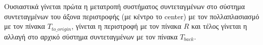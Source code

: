 \documentclass{article}
\begin{document}
Ουσιαστικά γίνεται πρώτα η μετατροπή συστήματος συντεταγμένων στο 
σύστημα συντεταγμένων του άξονα περιστροφής (με κέντρο το center)
με τον πολλαπλασιασμό με τον πίνακα $T_{to\_origin}$,
γίνεται η περιστροφή με τον πίνακα $R$ και τέλος γίνεται η
αλλαγή στο αρχικό σύστημα συντεταγμένων με τον πίνακα $T_{back}$.

%
%
%
%
%
%
%
%
%
%
%
%
%
%
%
%
\end{document}
